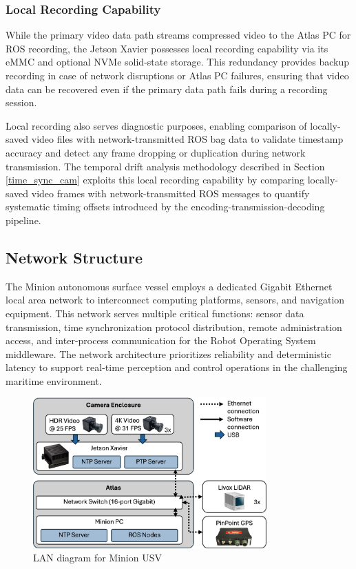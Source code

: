 \documentclass{erauthesis}
\begin{document}
\subsubsection{Local Recording Capability}

While the primary video data path streams compressed video to the Atlas PC for ROS recording, the Jetson Xavier possesses local recording capability via its eMMC and optional NVMe solid-state storage. This redundancy provides backup recording in case of network disruptions or Atlas PC failures, ensuring that video data can be recovered even if the primary data path fails during a recording session.

Local recording also serves diagnostic purposes, enabling comparison of locally-saved video files with network-transmitted ROS bag data to validate timestamp accuracy and detect any frame dropping or duplication during network transmission. The temporal drift analysis methodology described in Section \ref{time_sync_cam} exploits this local recording capability by comparing locally-saved video frames with network-transmitted ROS messages to quantify systematic timing offsets introduced by the encoding-transmission-decoding pipeline.

\subsection{Network Structure} \label{comp:network}

The Minion autonomous surface vessel employs a dedicated Gigabit Ethernet local area network to interconnect computing platforms, sensors, and navigation equipment. This network serves multiple critical functions: sensor data transmission, time synchronization protocol distribution, remote administration access, and inter-process communication for the Robot Operating System middleware. The network architecture prioritizes reliability and deterministic latency to support real-time perception and control operations in the challenging maritime environment.

\begin{figure}[htbp]
\centering
\includegraphics[width=0.8\textwidth]{Images/network_diagram2.png}
\caption{LAN diagram for Minion USV}
\label{fig:network_diagram}
\end{figure}
\end{document}
